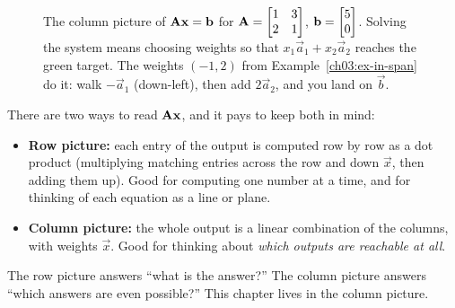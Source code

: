 \begin{figure}[H]
\centering
{}
\caption{The column picture of $\mathbf{A}\mathbf{x}=\mathbf{b}$ for $\mathbf{A}=\protect\begin{bmatrix}1&3\\2&1\protect\end{bmatrix}$, $\mathbf{b}=\begin{bmatrix}5\\0\end{bmatrix}$. Solving the system means choosing weights so that $x_1\vec{a}_1+x_2\vec{a}_2$ reaches the green target. The weights $(-1,2)$ from Example~\ref{ch03:ex-in-span} do it: walk $-\vec{a}_1$ (down-left), then add $2\vec{a}_2$, and you land on $\vec{b}$.}
\label{ch03:column-picture}
\end{figure}

\begin{intuitionbox}
There are two ways to read $\mathbf{A}\mathbf{x}$, and it pays to keep both in mind:
\begin{itemize}
  \item \textbf{Row picture:} each entry of the output is computed row by row as a dot product (multiplying matching entries across the row and down $\vec{x}$, then adding them up). Good for computing one number at a time, and for thinking of each equation as a line or plane.
  \item \textbf{Column picture:} the whole output is a linear combination of the columns, with weights $\vec{x}$. Good for thinking about \emph{which outputs are reachable at all}.
\end{itemize}
The row picture answers ``what is the answer?'' The column picture answers ``which answers are even possible?'' This chapter lives in the column picture.
\end{intuitionbox}

